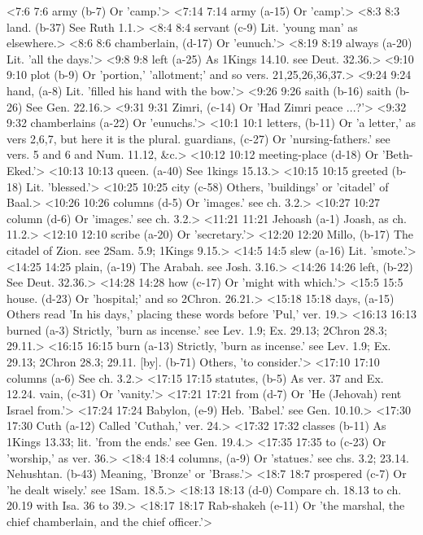 <7:6 7:6  army (b-7)  Or 'camp.'>
<7:14 7:14  army (a-15)  Or 'camp'.>
<8:3 8:3  land. (b-37)  See Ruth 1.1.>
<8:4 8:4  servant (c-9)  Lit. 'young man' as elsewhere.>
<8:6 8:6  chamberlain, (d-17)  Or 'eunuch.'>
<8:19 8:19  always (a-20)  Lit. 'all the days.'>
<9:8 9:8  left (a-25)  As 1Kings 14.10. see Deut. 32.36.>
<9:10 9:10  plot (b-9)  Or 'portion,' 'allotment;' and so vers. 21,25,26,36,37.>
<9:24 9:24  hand, (a-8)  Lit. 'filled his hand with the bow.'>
<9:26 9:26  saith (b-16)  saith (b-26)
  See Gen. 22.16.>
<9:31 9:31  Zimri, (c-14)  Or 'Had Zimri peace ...?'>
<9:32 9:32  chamberlains (a-22)  Or 'eunuchs.'>
<10:1 10:1  letters, (b-11)  Or 'a letter,' as vers 2,6,7, but here it is the plural.
  guardians, (c-27)  Or 'nursing-fathers.' see vers. 5 and 6 and Num. 11.12, &c.>
<10:12 10:12  meeting-place (d-18)  Or 'Beth-Eked.'>
<10:13 10:13  queen. (a-40)  See 1kings 15.13.>
<10:15 10:15  greeted (b-18)  Lit. 'blessed.'>
<10:25 10:25  city (c-58)  Others, 'buildings' or 'citadel' of Baal.>
<10:26 10:26  columns (d-5) Or 'images.' see ch. 3.2.>
<10:27 10:27  column (d-6)  Or 'images.' see ch. 3.2.>
<11:21 11:21  Jehoash (a-1)  Joash, as ch. 11.2.>
<12:10 12:10  scribe (a-20)  Or 'secretary.'>
<12:20 12:20  Millo, (b-17)  The citadel of Zion. see 2Sam. 5.9; 1Kings 9.15.>
<14:5 14:5  slew (a-16)  Lit. 'smote.'>
<14:25 14:25  plain, (a-19)  The Arabah. see Josh. 3.16.>
<14:26 14:26  left, (b-22)  See Deut. 32.36.>
<14:28 14:28  how (c-17)  Or 'might with which.'>
<15:5 15:5  house. (d-23)  Or 'hospital;' and so 2Chron. 26.21.>
<15:18 15:18  days, (a-15)  Others read 'In his days,' placing these words before 'Pul,'  ver. 19.>
<16:13 16:13  burned (a-3)  Strictly, 'burn as incense.' see Lev. 1.9; Ex. 29.13; 2Chron 28.3; 29.11.>
<16:15 16:15  burn (a-13)  Strictly, 'burn as incense.' see Lev. 1.9; Ex. 29.13; 2Chron 28.3; 29.11.
  [by]. (b-71)  Others, 'to consider.'>
<17:10 17:10  columns (a-6)  See ch. 3.2.>
<17:15 17:15  statutes, (b-5)  As ver. 37 and Ex. 12.24.
  vain, (c-31)  Or 'vanity.'>
<17:21 17:21  from (d-7)  Or 'He (Jehovah) rent Israel from.'>
<17:24 17:24  Babylon, (e-9)  Heb. 'Babel.' see Gen. 10.10.>
<17:30 17:30  Cuth (a-12)  Called 'Cuthah,' ver. 24.>
<17:32 17:32  classes (b-11)  As 1Kings 13.33; lit. 'from the ends.' see Gen. 19.4.>
<17:35 17:35  to (c-23)  Or 'worship,' as ver. 36.>
<18:4 18:4  columns, (a-9)  Or 'statues.' see chs. 3.2; 23.14.
  Nehushtan. (b-43)  Meaning, 'Bronze' or 'Brass.'>
<18:7 18:7  prospered (c-7)  Or 'he dealt wisely.' see 1Sam. 18.5.>
<18:13 18:13   (d-0)  Compare ch. 18.13 to ch. 20.19 with Isa. 36 to 39.>
<18:17 18:17  Rab-shakeh (e-11)  Or 'the marshal, the chief chamberlain, and the chief  officer.'>

